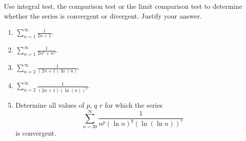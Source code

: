 Use integral test, the comparison test or the limit comparison test to determine whether the series is convergent or divergent. Justify your answer.
\begin{multicols}{2}
\begin{enumerate}
\item 
$\displaystyle \sum\limits_{n=1}^{\infty} \frac{1}{2n+1}$.

\item 
$\displaystyle \sum\limits_{n=1}^{\infty} \frac{1}{2n^2+n^3}$.

\item 
$\displaystyle \sum\limits_{n=2}^{\infty} \frac{1}{(2n+1)\ln (n)}$.

\item 
$\displaystyle \sum\limits_{n=2}^{\infty} \frac{1}{(2n+1)(\ln (n))^2}$.

\item 
Determine all values of $p$, $q$ $r$ for which the series 
\[
\displaystyle \sum_{n=30}^{\infty} \frac{1}{n^p(\ln n)^q(\ln (\ln n))^r}
\]
is convergent.
\end{enumerate}
\end{multicols}

